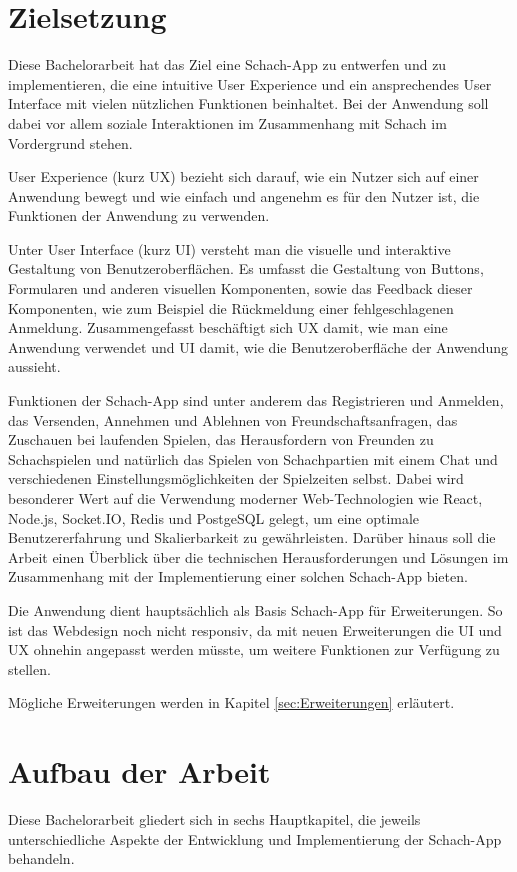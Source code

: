     \section{Zielsetzung}
    Diese Bachelorarbeit hat das Ziel eine Schach-App zu entwerfen und zu implementieren, die eine intuitive User Experience und ein ansprechendes User Interface mit vielen nützlichen Funktionen beinhaltet. Bei der Anwendung soll dabei vor allem soziale Interaktionen im Zusammenhang mit Schach im Vordergrund stehen.
    
User Experience (kurz UX) bezieht sich darauf, wie ein Nutzer sich auf einer Anwendung bewegt und wie einfach und angenehm es für den Nutzer ist, die Funktionen der Anwendung zu verwenden.
    
    Unter User Interface (kurz UI) versteht man die visuelle und interaktive Gestaltung von Benutzeroberflächen. Es umfasst die Gestaltung von Buttons, Formularen und anderen visuellen Komponenten, sowie das Feedback dieser Komponenten, wie zum Beispiel die Rückmeldung einer fehlgeschlagenen Anmeldung.
    Zusammengefasst beschäftigt sich UX damit, wie man eine Anwendung verwendet und UI damit, wie die Benutzeroberfläche der Anwendung aussieht.\cite{webdesign}
        
        Funktionen der Schach-App sind unter anderem das Registrieren und Anmelden, das Versenden, Annehmen und Ablehnen von Freundschaftsanfragen, das Zuschauen bei laufenden Spielen, das Herausfordern von Freunden zu Schachspielen und natürlich das Spielen von Schachpartien mit einem Chat und verschiedenen Einstellungsmöglichkeiten der Spielzeiten selbst.
    Dabei wird besonderer Wert auf die Verwendung moderner Web-Technologien wie React, Node.js, Socket.IO, Redis und PostgeSQL gelegt, um eine optimale Benutzererfahrung und Skalierbarkeit zu gewährleisten. Darüber hinaus soll die Arbeit einen Überblick über die technischen Herausforderungen und Lösungen im Zusammenhang mit der Implementierung einer solchen Schach-App bieten.
    
Die Anwendung dient hauptsächlich als Basis Schach-App für Erweiterungen. So ist das Webdesign noch nicht responsiv, da mit neuen Erweiterungen die UI und UX ohnehin angepasst werden müsste, um weitere Funktionen zur Verfügung zu stellen.

Mögliche Erweiterungen werden in Kapitel \ref{sec:Erweiterungen} erläutert.
    
    \section{Aufbau der Arbeit}
Diese Bachelorarbeit gliedert sich in sechs Hauptkapitel, die jeweils unterschiedliche Aspekte der Entwicklung und Implementierung der Schach-App behandeln.

